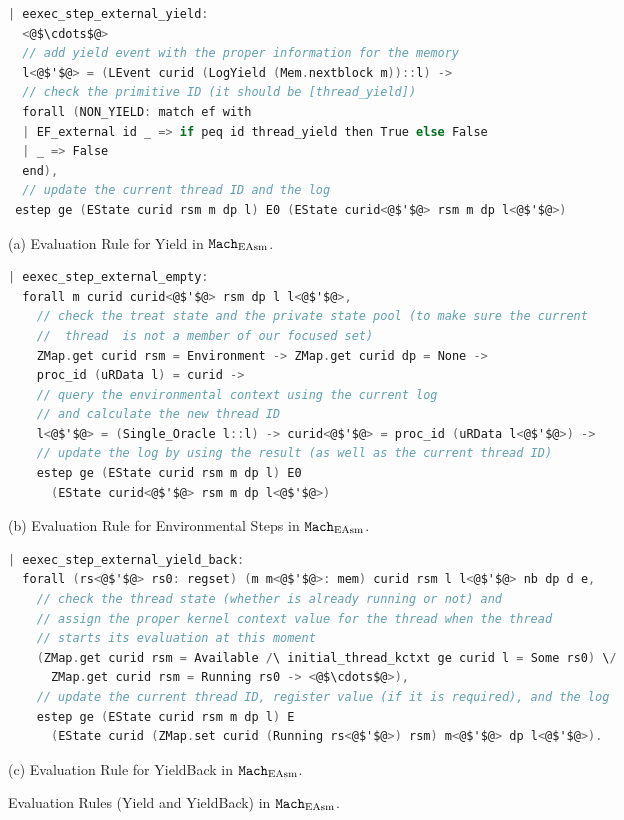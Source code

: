 \begin{figure}
\begin{lstlisting}[language=C]
| eexec_step_external_yield:
  <@$\cdots$@>
  // add yield event with the proper information for the memory 
  l<@$'$@> = (LEvent curid (LogYield (Mem.nextblock m))::l) ->
  // check the primitive ID (it should be [thread_yield])  
  forall (NON_YIELD: match ef with
  | EF_external id _ => if peq id thread_yield then True else False
  | _ => False 
  end),
  // update the current thread ID and the log
 estep ge (EState curid rsm m dp l) E0 (EState curid<@$'$@> rsm m dp l<@$'$@>)
\end{lstlisting}
\begin{center}
(a) Evaluation Rule for Yield in ${\mathrm{\texttt{Mach}}}_{\mathrm{EAsm}}$.
\end{center}
\begin{lstlisting}[language=C]
| eexec_step_external_empty:
  forall m curid curid<@$'$@> rsm dp l l<@$'$@>,
    // check the treat state and the private state pool (to make sure the current
    //  thread  is not a member of our focused set)
    ZMap.get curid rsm = Environment -> ZMap.get curid dp = None ->
    proc_id (uRData l) = curid ->
    // query the environmental context using the current log 
    // and calculate the new thread ID
    l<@$'$@> = (Single_Oracle l::l) -> curid<@$'$@> = proc_id (uRData l<@$'$@>) ->
    // update the log by using the result (as well as the current thread ID)
    estep ge (EState curid rsm m dp l) E0
      (EState curid<@$'$@> rsm m dp l<@$'$@>)
\end{lstlisting}
\begin{center}
(b) Evaluation Rule for Environmental Steps in ${\mathrm{\texttt{Mach}}}_{\mathrm{EAsm}}$.
\end{center}
\begin{lstlisting}[language=C]
| eexec_step_external_yield_back:
  forall (rs<@$'$@> rs0: regset) (m m<@$'$@>: mem) curid rsm l l<@$'$@> nb dp d e,
    // check the thread state (whether is already running or not) and
    // assign the proper kernel context value for the thread when the thread
    // starts its evaluation at this moment
    (ZMap.get curid rsm = Available /\ initial_thread_kctxt ge curid l = Some rs0) \/
      ZMap.get curid rsm = Running rs0 -> <@$\cdots$@>),
    // update the current thread ID, register value (if it is required), and the log
    estep ge (EState curid rsm m dp l) E
      (EState curid (ZMap.set curid (Running rs<@$'$@>) rsm) m<@$'$@> dp l<@$'$@>).
\end{lstlisting}
\begin{center}
(c) Evaluation Rule for YieldBack in ${\mathrm{\texttt{Mach}}}_{\mathrm{EAsm}}$.
\end{center}
\caption{Evaluation Rules (Yield and YieldBack) in ${\mathrm{\texttt{Mach}}}_{\mathrm{EAsm}}$.}
\label{fig:chapter:linking:eval-rule-in-easm-yield}
\end{figure}


